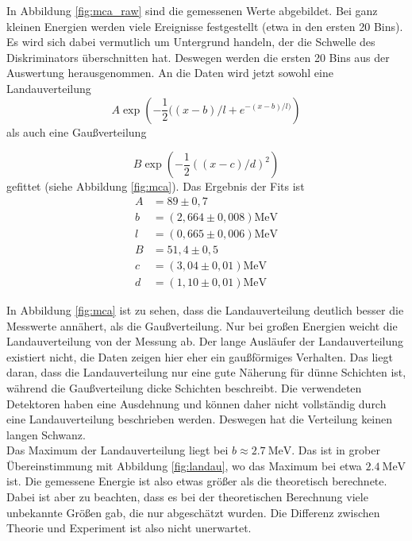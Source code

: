 In Abbildung \ref{fig:mca_raw} sind die gemessenen Werte abgebildet. Bei ganz kleinen Energien werden viele Ereignisse festgestellt (etwa in den ersten 20 Bins). Es wird sich dabei vermutlich um Untergrund handeln, der die Schwelle des Diskriminators überschnitten hat. Deswegen werden die ersten 20 Bins aus der Auswertung herausgenommen. An die Daten wird jetzt sowohl eine Landauverteilung
\[A\exp{\left(-\frac{1}{2}((x-b)/l + e^{-(x-b)/l)}\right)}\] als auch eine Gaußverteilung

\[B\exp{\left(-\frac{1}{2}((x-c)/d)^2 \right)}\]
 gefittet (siehe Abbildung \ref{fig:mca}). Das Ergebnis der Fits ist
 \begin{align}
 A &= 89 \pm 0,7\\
 b &= (2,664 \pm 0,008)\si{\mega\eV}\\
 l &= (0,665  \pm 0,006)\si{\mega\eV}\\
 B &= 51,4 \pm 0,5\\
 c &= (3,04\pm 0,01)\si{\mega\eV}\\
 d &=( 1,10 \pm 0,01) \si{\mega\eV}
 \end{align}
 
In Abbildung \ref{fig:mca} ist zu sehen, dass die Landauverteilung deutlich besser die Messwerte annähert, als die Gaußverteilung. Nur bei großen Energien weicht die Landauverteilung von der Messung ab. Der lange Ausläufer der Landauverteilung existiert nicht, die Daten zeigen hier eher ein gaußförmiges Verhalten. Das liegt daran, dass die Landauverteilung nur eine gute Näherung für dünne Schichten ist, während die Gaußverteilung dicke Schichten beschreibt. Die verwendeten Detektoren haben eine Ausdehnung und können daher nicht vollständig durch eine Landauverteilung beschrieben werden. Deswegen hat die Verteilung keinen langen Schwanz.\\

Das Maximum der Landauverteilung liegt bei $b \approx \SI{2.7}{\mega\eV}$. Das ist in grober Übereinstimmung mit Abbildung \ref{fig:landau}, wo das Maximum bei etwa $\SI{2.4}{\mega\eV}$ ist. Die gemessene Energie ist also etwas größer als die theoretisch berechnete. Dabei ist aber zu beachten, dass es bei der theoretischen Berechnung viele unbekannte Größen gab, die nur abgeschätzt wurden. Die Differenz zwischen Theorie und Experiment ist also nicht unerwartet.

